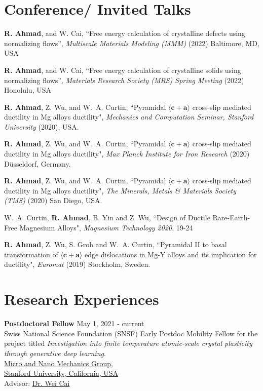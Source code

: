 \documentclass[margin,line]{resume}
\begin{document}
\begin{resume}
    \clearpage
    \section{\mysidestyle Conference/ Invited Talks}

    \textbf{R. Ahmad}, and W. Cai, ``Free energy calculation of crystalline defects using normalizing flows'', \textit{Multiscale Materials Modeling (MMM)} (2022) Baltimore, MD, USA

    \textbf{R. Ahmad}, and W. Cai, ``Free energy calculation of crystalline solids using normalizing flows'', \textit{Materials Research Society (MRS) Spring Meeting} (2022) Honolulu, USA

    \textbf{R. Ahmad}, Z. Wu, and W.~A. Curtin, ``Pyramidal $\langle \boldsymbol{c} + \boldsymbol{a} \rangle$ cross-slip mediated ductility in Mg alloys ductility", \textit{Mechanics and Computation Seminar, Stanford University} (2020), USA.

    \textbf{R. Ahmad}, Z. Wu, and W.~A. Curtin, ``Pyramidal $\langle \boldsymbol{c} + \boldsymbol{a} \rangle$ cross-slip mediated ductility in Mg alloys ductility", \textit{Max Planck Institute for Iron Research} (2020) D\"usseldorf, Germany.

    \textbf{R. Ahmad}, Z. Wu, and W.~A. Curtin, ``Pyramidal $\langle \boldsymbol{c} + \boldsymbol{a} \rangle$ cross-slip mediated ductility in Mg alloys ductility", \textit{The Minerals, Metals \& Materials Society (TMS)} (2020) San Diego, USA.

    W.~A. Curtin, \textbf{R. Ahmad}, B. Yin and Z. Wu, ``Design of Ductile Rare-Earth-Free Magnesium Alloys", \textit{Magnesium Technology 2020}, 19-24

    \textbf{R. Ahmad}, Z. Wu, S. Groh and W.~A. Curtin, ``Pyramidal II to basal transformation of $\langle
        \boldsymbol{c} + \boldsymbol{a} \rangle$ edge dislocations in Mg-Y alloys and its implication for
    ductility", \textit{Euromat} (2019) Stockholm, Sweden.


    \section{\mysidestyle Research Experiences}
    \textbf{\textsf{Postdoctoral Fellow}}    \hfill  \small{May 1, 2021 - current} \\
    Swiss National Science Foundation (SNSF) Early Postdoc Mobility Fellow for the project titled \textit{Investigation into finite temperature atomic-scale crystal plasticity through generative deep learning}.\\
    \href{https://micronano.stanford.edu/}{Micro and Nano Mechanics Group}, \\
    \href{https://www.stanford.edu/}{Stanford University, California, USA}\\
    Advisor:  \href{https://web.stanford.edu/~caiwei/}{Dr. Wei Cai}



\end{resume}
\end{document}
